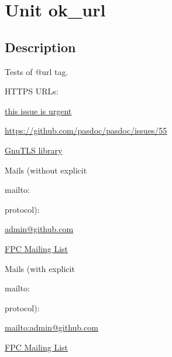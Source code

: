 \documentclass{report}
\begin{document}
\label{toc}\tableofcontents
\newpage
\newlength{\tmplength}
\chapter{Unit ok{\_}url}
\label{ok_url}
\section{Description}
Tests of @url tag.

HTTPS URLs:

\href{https://github.com/pasdoc/pasdoc/issues/36}{this issue is urgent}

\href{https://github.com/pasdoc/pasdoc/issues/55}{https://github.com/pasdoc/pasdoc/issues/55}

\href{https://www.gnutls.org}{GnuTLS library}

Mails (without explicit \begin{ttfamily}mailto:\end{ttfamily} protocol):

\href{mailto:admin@github.com}{admin@github.com}

\href{mailto:fpc-devel@lists.freepascal.org}{FPC Mailing List}

Mails (with explicit \begin{ttfamily}mailto:\end{ttfamily} protocol):

\href{mailto:admin@github.com}{mailto:admin@github.com}

\href{mailto:fpc-devel@lists.freepascal.org}{FPC Mailing List}
\end{document}
